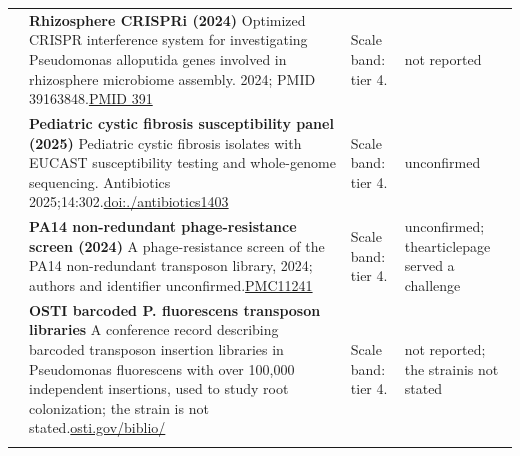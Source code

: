 \begin{landscape}
\begin{longtable}{@{}r@{\hspace{4pt}} L{78mm} L{72mm} L{76mm}@{}}
 & \textbf{Rhizosphere CRISPRi (2024)} \newline Optimized CRISPR interference system for investigating Pseudomonas alloputida genes involved in rhizosphere microbiome assembly. 2024; PMID 39163848.\newline \href{https://pubmed.ncbi.nlm.nih.gov/39163848/}{PMID 391} & Scale band: tier 4. & not repo\allowbreak rted \\
 & \textbf{Pediatric cystic fibrosis susceptibility panel (2025)} \newline Pediatric cystic fibrosis isolates with EUCAST susceptibility testing and whole-genome sequencing. Antibiotics 2025;14:302.\newline \href{https://doi.org/10.3390/antibiotics14030302}{doi:./\allowbreak antibio\allowbreak tics1403} & Scale band: tier 4. & unconfir\allowbreak med \\
 & \textbf{PA14 non-redundant phage-resistance screen (2024)} \newline A phage-resistance screen of the PA14 non-redundant transposon library, 2024; authors and identifier unconfirmed.\newline \href{https://www.ncbi.nlm.nih.gov/pmc/articles/PMC11241198/}{PMC11241} & Scale band: tier 4. & unconfir\allowbreak med; the\allowbreak  article\allowbreak  page se\allowbreak rved a c\allowbreak hallenge \\
 & \textbf{OSTI barcoded P. fluorescens transposon libraries} \newline A conference record describing barcoded transposon insertion libraries in Pseudomonas fluorescens with over 100,000 independent insertions, used to study root colonization; the strain is not stated.\newline \href{https://www.osti.gov/biblio/1236050}{osti.\allowbreak gov/\allowbreak biblio/} & Scale band: tier 4. & not repo\allowbreak rted; th\allowbreak e strain\allowbreak  is not \allowbreak stated \\
\addlinespace[5pt]

\end{longtable}
\end{landscape}

